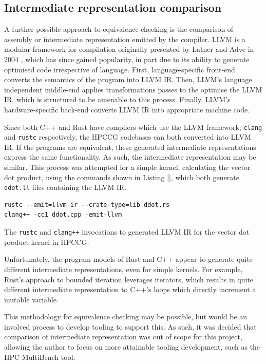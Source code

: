 \subsection{Intermediate representation comparison}
\label{sec:equivalence-ir-comparison}

A further possible approach to equivalence checking is the comparison of assembly or intermediate representation emitted by the compiler. LLVM is a modular framework for compilation originally presented by Latner and Adve in 2004 \cite{lattner2004llvm}, which has since gained popularity, in part due to its ability to generate optimised code irrespective of language. First, language-specific front-end converts the semantics of the program into LLVM IR. Then, LLVM's language independent middle-end applies transformations passes to the optimise the LLVM IR, which is structured to be amenable to this process. Finally, LLVM's hardware-specific back-end converts LLVM IR into appropriate machine code.

Since both C++ and Rust have compilers which use the LLVM framework, \texttt{clang} and \texttt{rustc} respectively, the HPCCG codebases can both converted into LLVM IR. If the programs are equivalent, these generated intermediate representations express the same functionality. As such, the intermediate representation may be similar. This process was attempted for a simple kernel, calculating the vector dot product, using the commands shown in Listing \ref{}, which both generate \texttt{ddot.ll} files containing the LLVM IR.

\begin{listing}[H]
    \begin{verbatim}
rustc --emit=llvm-ir --crate-type=lib ddot.rs
clang++ -cc1 ddot.cpp -emit-llvm
    \end{verbatim}
    \caption{The \texttt{rustc} and \texttt{clang++} invocations to generated LLVM IR for the vector dot product kernel in HPCCG.}
    \label{listing:rust-sparsemv-rayon}
\end{listing}

Unfortunately, the program models of Rust and C++ appear to generate quite different intermediate representations, even for simple kernels. For example, Rust's approach to bounded iteration leverages iterators, which results in quite different intermediate representation to C++'s loops which directly increment a mutable variable.

This methodology for equivalence checking may be possible, but would be an involved process to develop tooling to support this. As such, it was decided that comparison of intermediate representation was out of scope for this project, allowing the author to focus on more attainable tooling development, such as the HPC MultiBench tool.

